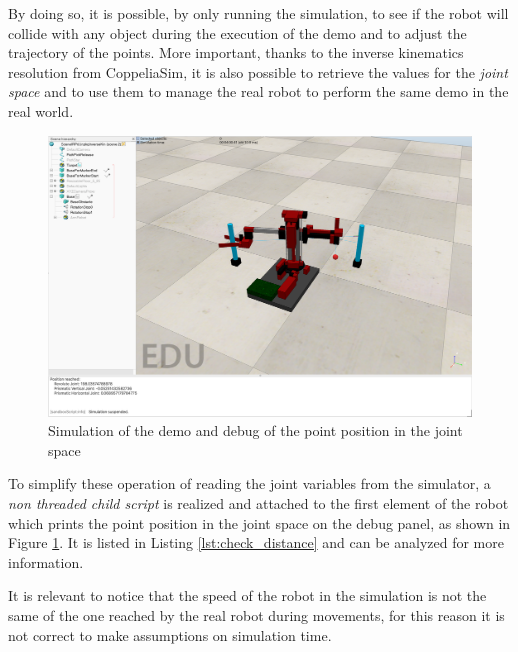 

By doing so, it is possible, by only running the simulation, to see if the robot will collide with any object during the execution of the demo and to adjust the trajectory of the points. More important, thanks to the inverse kinematics resolution from CoppeliaSim, it is also possible to retrieve the values for the \textit{joint space} and to use them to manage the real robot to perform the same demo in the real world.

\begin{figure}[h]
\begin{center}
\includegraphics[width=\linewidth]{capitolo3/figure/print_distance}
\caption{Simulation of the demo and debug of the point position in the joint space}
\label{fig:print_distance} 
\end{center}
\end{figure}

To simplify these operation of reading the joint variables from the simulator, a \textit{non threaded child script} is realized and attached to the first element of the robot which prints the point position in the joint space on the debug panel, as shown in Figure \ref{fig:print_distance}. It is listed in Listing \ref{lst:check_distance} and can be analyzed for more information.

It is relevant to notice that the speed of the robot in the simulation is not the same of the one reached by the real robot during movements, for this reason it is not correct to make assumptions on simulation time.

